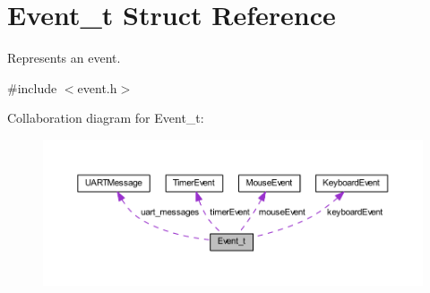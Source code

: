 \hypertarget{struct_event__t}{}\section{Event\+\_\+t Struct Reference}
\label{struct_event__t}


Represents an event.  




{\ttfamily \#include $<$event.\+h$>$}



Collaboration diagram for Event\+\_\+t\+:\nopagebreak
\begin{figure}[H]
\begin{center}
\leavevmode
\includegraphics[width=350pt]{struct_event__t__coll__graph}
\end{center}
\end{figure}
